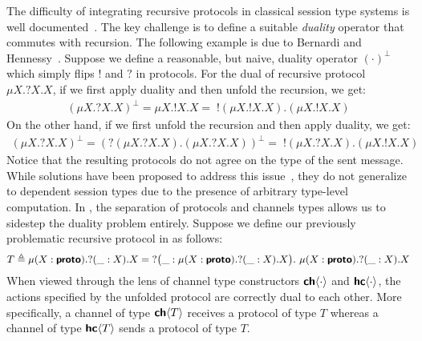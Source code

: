 The difficulty of integrating recursive protocols in classical session type
systems is well documented~\cite{gay20}. The key challenge is to define a
suitable \emph{duality} operator that commutes with recursion. The following
example is due to Bernardi and Hennessy~\cite{bernardi16}. Suppose we define a 
reasonable, but naive, duality operator $(\cdot)^\bot$ which simply flips $!$
and $?$ in protocols.  For the dual of recursive protocol $\mu{X}.{?X}.X$, if we
first apply duality and then unfold the recursion, we get:
\begin{align*}
  (\mu{X}.{?X}.X)^\bot  = \mu{X}.{!X}.X =\; !(\mu{X}.{!X}.X).(\mu{X}.{!X}.X)
\end{align*} 
On the other hand, if we first unfold the recursion and then apply duality, we get:
\begin{align*}
  (\mu{X}.{?X}.X)^\bot = (?(\mu{X}.{?X}.X).(\mu{X}.{?X}.X))^\bot =\; !(\mu{X}.{?X}.X).(\mu{X}.{!X}.X)
\end{align*} 
Notice that the resulting protocols do not agree on the type of the sent message.
While solutions have been proposed to address this issue~\cite{bernardi16,bernardi14},
they do not generalize to dependent session types due to the presence of arbitrary
type-level computation. In \TLLC{}, the separation of protocols and channels types
allows us to sidestep the duality problem entirely. Suppose we define our previously
problematic recursive protocol in \TLLC{} as follows:
\begin{align*}
  T \triangleq \mu({X : \textbf{\textsf{proto}}}).{?(\_ : X). X} =\; ?\big(\_ : \mu({X : \textbf{\textsf{proto}}}).{?(\_ : X). X}\big).\ \mu({X : \textbf{\textsf{proto}}}).{?(\_ : X). X}
\end{align*}
When viewed through the lens of channel type constructors ${\textbf{\textsf{ch}}\langle{\cdot}\rangle}$ and ${\textbf{\textsf{hc}}\langle{\cdot}\rangle}$,
the actions specified by the unfolded protocol are correctly dual to each other.
More specifically, a channel of type ${\textbf{\textsf{ch}}\langle{T}\rangle}$ receives a protocol of type $T$ whereas
a channel of type ${\textbf{\textsf{hc}}\langle{T}\rangle}$ sends a protocol of type $T$.


